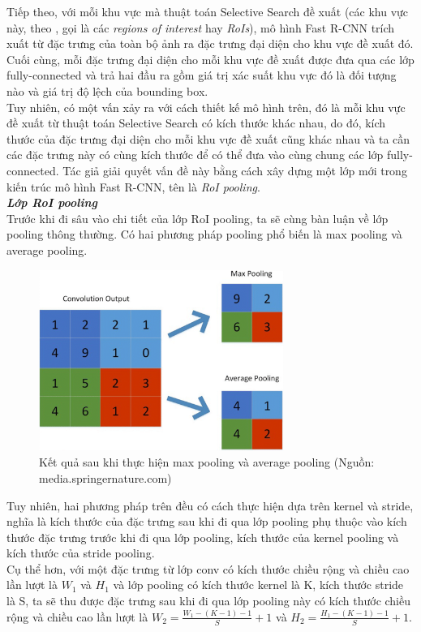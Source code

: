 {        Tiếp theo, với mỗi khu vực mà thuật toán Selective Search đề xuất (các khu vực này, theo \cite{girshick2015fast}, gọi là các \textit{regions of interest} hay \textit{RoIs}), mô hình Fast R-CNN trích xuất từ đặc trưng của toàn bộ ảnh ra đặc trưng đại diện cho khu vực đề xuất đó.
        Cuối cùng, mỗi đặc trưng đại diện cho mỗi khu vực đề xuất được đưa qua các lớp fully-connected và trả hai đầu ra gồm giá trị xác suất khu vực đó là đối tượng nào và giá trị độ lệch của bounding box. \\
        Tuy nhiên, có một vấn xảy ra với cách thiết kế mô hình trên, đó là mỗi khu vực đề xuất từ thuật toán Selective Search có kích thước khác nhau, do đó, kích thước của đặc trưng đại diện cho mỗi khu vực đề xuất cũng khác nhau và ta cần các đặc trưng này có cùng kích thước để có thể đưa vào cùng chung các lớp fully-connected.
        Tác giả giải quyết vấn đề này bằng cách xây dựng một lớp mới trong kiến trúc mô hình Fast R-CNN, tên là \textit{RoI pooling}. \\

        \textbf{\textit{Lớp RoI pooling}} \\
        Trước khi đi sâu vào chi tiết của lớp RoI pooling, ta sẽ cùng bàn luận về lớp pooling thông thường.
        Có hai phương pháp pooling phổ biến là max pooling và average pooling.
        \begin{figure}[H]
            \centering
            \includegraphics[width=8cm] {images/pooling}
            \caption{Kết quả sau khi thực hiện max pooling và average pooling (Nguồn: media.springernature.com)}
            \label{fig:pooling}
        \end{figure}

        \noindent
        Tuy nhiên, hai phương pháp trên đều có cách thực hiện dựa trên kernel và stride, nghĩa là kích thước của đặc trưng sau khi đi qua lớp pooling phụ thuộc vào kích thước đặc trưng trước khi đi qua lớp pooling, kích thước của kernel pooling và kích thước của stride pooling. \\
        Cụ thể hơn, với một đặc trưng từ lớp conv có kích thước chiều rộng và chiều cao lần lượt là ${W}_{1}$ và ${H}_{1}$ và lớp pooling có kích thước kernel là K, kích thước stride là S, ta sẽ thu được đặc trưng sau khi đi qua lớp pooling này có kích thước chiều rộng và chiều cao lần lượt là ${W}_{2} = \frac{{W}_{1} - (K - 1) - 1}{S} + 1$ và ${H}_{2} = \frac{{H}_{1} - (K - 1) - 1}{S} + 1$.

}
